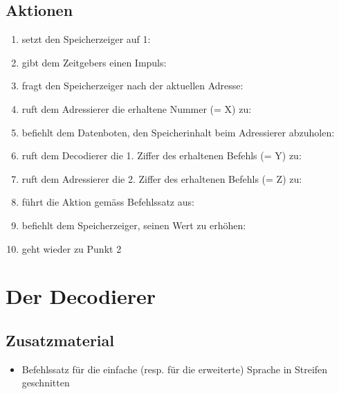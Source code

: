 \documentclass[a4paper]{kinet-intern}
\begin{document}
\subsection*{Aktionen}
\begin{enumerate}
	\item setzt den Speicherzeiger auf 1:\\
	\item gibt dem Zeitgebers einen Impuls:\\
	\item fragt den Speicherzeiger nach der aktuellen Adresse:\\
	\item ruft dem Adressierer die erhaltene Nummer (= X) zu:\\
	\item befiehlt dem Datenboten, den Speicherinhalt beim Adressierer abzuholen:\\
	\item ruft dem Decodierer die 1. Ziffer des erhaltenen Befehls (= Y) zu:\\
	\item ruft dem Adressierer die 2. Ziffer des erhaltenen Befehls (= Z) zu:\\
	\item führt die Aktion gemäss Befehlssatz aus:
		\vspace{9cm}
	\item befiehlt dem Speicherzeiger, seinen Wert zu erhöhen:\\
	\item geht wieder zu Punkt 2
\end{enumerate}


\section*{Der Decodierer}

\subsection*{Zusatzmaterial}
\begin{itemize}
	\item Befehlssatz für die einfache (resp. für die erweiterte) Sprache in Streifen geschnitten
\end{itemize}
\end{document}
